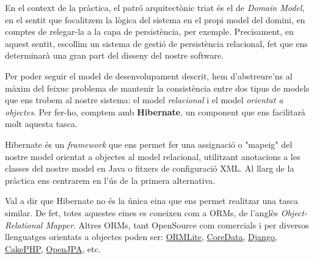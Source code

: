 En el context de la pràctica, el patró arquitectònic triat és el de \emph{Domain Model}, en el sentit que focalitzem la lògica del sistema en el propi model del domini, en comptes de relegar-la a la capa de persistència, per exemple. Precisament, en aquest sentit, escollim un sistema de gestió de persistència relacional, fet que ens determinarà una gran part del disseny del nostre software.

Per poder seguir el model de desenvolupament descrit, hem d'abstreure'ns al màxim del feixuc problema de mantenir la consistència entre dos tipus de models que ens trobem al nostre sistema: el model \emph{relacional} i el model \emph{orientat a objectes}. Per fer-ho, comptem amb \textbf{Hibernate}, un component que ens facilitarà molt aquesta tasca.

Hibernate \cite{website:Hibernate} és un \emph{framework} que ens permet fer una assignació o "mapeig" del nostre model orientat a objectes al model relacional, utilitzant anotacions a les classes del nostre model en Java o fitxers de configuració XML. Al llarg de la pràctica ens centrarem en l'ús de la primera alternativa.

Val a dir que Hibernate no és la única eina que ens permet realitzar una tasca similar. De fet, totes aquestes eines es coneixen com a ORMs, de l'anglès \emph{Object-Relational Mapper}. Altres ORMs, tant OpenSource com comercials i per diversos llenguatges orientats a objectes poden ser: \hyperlink{http://ormlite.com/}{ORMLite}, \href{https://developer.apple.com/technologies/mac/data-management.html}{CoreData}, \href{https://www.djangoproject.com/}{Django}, \href{http://cakephp.org/}{CakePHP}, \href{http://openjpa.apache.org/}{OpenJPA}, etc.